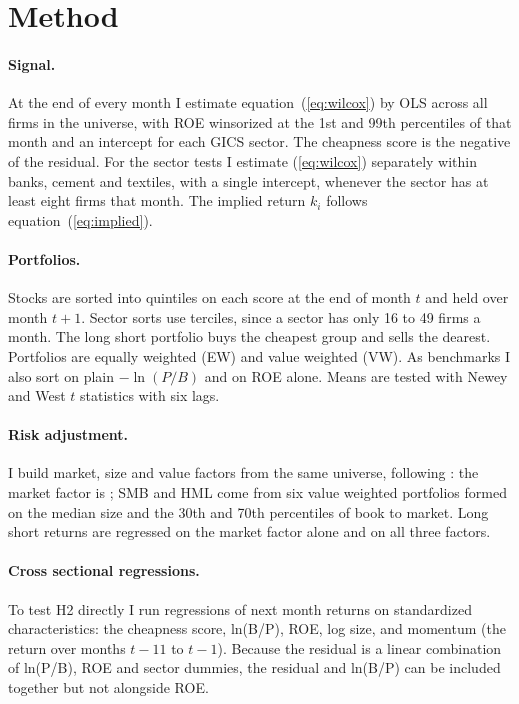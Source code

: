 \documentclass[11pt]{article}
\begin{document}
\section{Method}\label{sec:method}

\paragraph{Signal.} At the end of every month I estimate equation~(\ref{eq:wilcox}) by OLS across all
firms in the universe, with ROE winsorized at the 1st and 99th percentiles of that month and an
intercept for each GICS sector. The cheapness score is the negative of the residual. For the sector
tests I estimate (\ref{eq:wilcox}) separately within banks, cement and textiles, with a single
intercept, whenever the sector has at least eight firms that month. The implied return $k_i$ follows
equation~(\ref{eq:implied}).

\paragraph{Portfolios.} Stocks are sorted into quintiles on each score at the end of month $t$ and
held over month $t+1$. Sector sorts use terciles, since a sector has only 16 to 49 firms a month.
The long short portfolio buys the cheapest group and sells the dearest. Portfolios are equally
weighted (EW) and value weighted (VW). As benchmarks I also sort on plain $-\ln(P/B)$ and on ROE alone.
Means are tested with Newey and West \citeyearpar{neweywest1987} $t$ statistics with six lags.

\paragraph{Risk adjustment.} I build market, size and value factors from the same universe, following
\citet{famafrench1993}: the market factor is \MktDef{}; SMB and HML come from six value weighted
portfolios formed on the median size and the 30th and 70th percentiles of book to market. Long
short returns are regressed on the market factor alone and on all three factors.

\paragraph{Cross sectional regressions.} To test H2 directly I run \citet{famamacbeth1973}
regressions of next month returns on standardized characteristics: the cheapness score, ln(B/P),
ROE, log size, and momentum (the return over months $t-11$ to $t-1$). Because the residual is a linear
combination of ln(P/B), ROE and sector dummies, the residual and ln(B/P) can be included together
but not alongside ROE.
\end{document}
